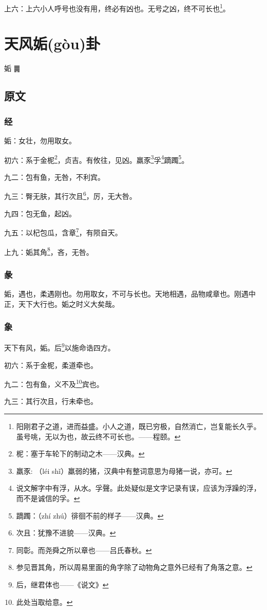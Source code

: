 \documentclass[12pt,oneside]{book}
\begin{document}
上六：上六小人呼号也没有用，终必有凶也。无号之凶，终不可长也\footnote{阳刚君子之道，进而益盛。小人之道，既已穷极，自然消亡，岂复能长久乎。虽号咷，无以为也，故云终不可长也。——程颐。}。



\chapter{天风姤(gòu)卦}
姤 {\Large ䷫}

\section{原文}

\subsection{经}
姤：女壮，勿用取女。

初六：系于金柅\footnote{柅：塞于车轮下的制动之木——汉典。}，贞吉。有攸往，见凶。羸豕\footnote{羸豕: （léi shǐ）羸弱的猪，汉典中有整词意思为母猪一说，亦可。}孚\footnote{说文解字中有浮，从水。孚聲。此处疑似是文字记录有误，应该为浮躁的浮，而不是诚信的孚。}蹢躅\footnote{蹢躅：（zhí zhú）徘徊不前的样子——汉典。}。

九二：包有鱼，无咎，不利宾。

九三：臀无肤，其行次且\footnote{次且：犹豫不进貌——汉典。}，厉，无大咎。

九四：包无鱼，起凶。

九五：以杞包瓜，含章\footnote{同彰。而尧舜之所以章也——吕氏春秋。}，有陨自天。

上九：姤其角\footnote{参见晋其角，所以周易里面的角字除了动物角之意外已经有了角落之意。}，吝，无咎。


\subsection{彖}
姤，遇也，柔遇刚也。勿用取女，不可与长也。天地相遇，品物咸章也。刚遇中正，天下大行也。姤之时义大矣哉。

\subsection{象}
天下有风，姤。后\footnote{后，继君体也——《说文》}以施命诰四方。

初六：系于金柅，柔道牵也。

九二：包有鱼，义不及\footnote{此处当取给意。}宾也。

九三：其行次且，行未牵也。
\end{document}
